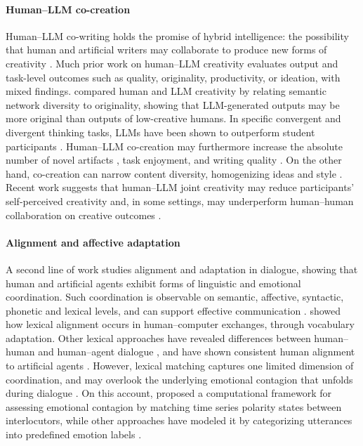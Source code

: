 \documentclass[11pt]{article}
\begin{document}
\paragraph{Human--LLM co-creation}
Human--LLM co-writing holds the promise of hybrid intelligence: the possibility that human and artificial writers may collaborate to produce new forms of creativity \cite{cheng2025inspiration, rafner2023creativity}. Much prior work on human--LLM creativity evaluates output and task-level outcomes such as quality, originality, productivity, or ideation, with mixed findings. \citet{Domanti_2026} compared human and LLM creativity by relating semantic network diversity to originality, showing that LLM-generated outputs may be more original than outputs of low-creative humans. In specific convergent and divergent thinking tasks, LLMs have been shown to outperform student participants \cite{arora2025generative}. Human--LLM co-creation may furthermore increase the absolute number of novel artifacts \cite{zhou2025expands}, task enjoyment, and writing quality \cite{noy2023experimental}. On the other hand, co-creation can narrow content diversity, homogenizing ideas and style \cite{wenger2025weredifferentweresame,anderson2024homogenization}. Recent work suggests that human--LLM joint creativity may reduce participants' self-perceived creativity \cite{luchini2025creative} and, in some settings, may underperform human--human collaboration on creative outcomes \cite{tang2025best}.

\paragraph{Alignment and affective adaptation}
A second line of work studies alignment and adaptation in dialogue, showing that human and artificial agents exhibit forms of linguistic and emotional coordination. Such coordination is observable on semantic, affective, syntactic, phonetic and lexical levels, and can support effective communication \cite{branigan2010linguistic}. \citet{koulouri2016and} showed how lexical alignment occurs in human--computer exchanges, through vocabulary adaptation. Other lexical approaches have revealed differences between human--human and human--agent dialogue \cite{duplessis2021towards, li2025ai}, and have shown consistent human alignment to artificial agents \cite{ostrand2023rapid}. However, lexical matching captures one limited dimension of coordination, and may overlook the underlying emotional contagion that unfolds during dialogue \cite{hatfield1993emotional}. On this account, \citet{varni2017computational} proposed a computational framework for assessing emotional contagion by matching time series polarity states between interlocutors, while other approaches have modeled it by categorizing utterances into predefined emotion labels \cite{poria2019emotion}. %
\end{document}
